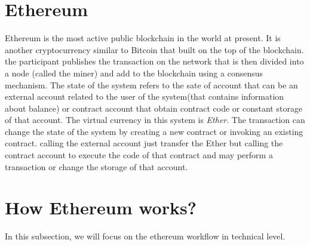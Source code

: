  \section{Ethereum}
 Ethereum is the most active public blockchain in the world at
present. It is another cryptocurrency similar to Bitcoin that built on the top of the blockchain. the participant publishes the transaction on the network that is then divided into a node (called the miner) and add to the blockchain using a consensus mechanism. The state of the system refers to the sate of account that can be an external account related to the user of the system(that contains information about balance) or contract account that obtain contract code or constant storage of that account. The virtual currency in this system is \textit{Ether}. The transaction can change the state of the system by creating a new contract or invoking an existing contract. calling the external account just transfer the Ether but calling the contract account to execute the code of that contract and may perform a transaction or change the storage of that account\cite{Ilya}.

\section{How Ethereum works?}
In this subsection, we will focus on the ethereum  workflow in technical level.
